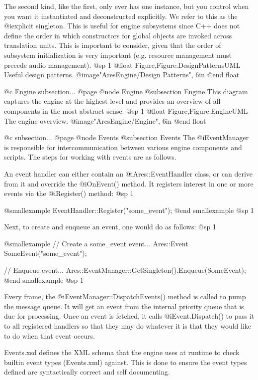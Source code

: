 The second kind, like the first, only ever has one instance, but you control when you want it instantiated and deconstructed explicitly. We refer to this as the @i{explicit singleton}. This is useful for engine subsystems since C++ does not define the order in which constructors for global objects are invoked across translation units. This is important to consider, given that the order of subsystem initialization is very important (e.g. resource management must precede audio management).
@sp 1
@float Figure,Figure:DesignPatternsUML
Useful design patterns.
@image{"AresEngine/Design Patterns", 6in}
@end float

@c Engine subsection...
@page
@node Engine
@subsection Engine
This diagram captures the engine at the highest level and provides an overview of all components in the most abstract sense.
@sp 1
@float Figure,Figure:EngineUML
The engine overview.
@image{"AresEngine/Engine", 6in}
@end float

@c subsection...
@page 
@node Events
@subsection Events
The @i{EventManager} is responsible for intercommunication between various engine components and scripts. The steps for working with events are as follows.

An event handler can either contain an @i{Ares::EventHandler} class, or can derive from it and override the @i{OnEvent()} method. It registers interest in one or more events via the @i{Register()} method:
@sp 1

@smallexample
EventHandler::Register("some_event");
@end smallexample
@sp 1

Next, to create and enqueue an event, one would do as follows:
@sp 1

@smallexample
// Create a some_event event...
Ares::Event SomeEvent("some_event");

// Enqueue event...
Ares::EventManager::GetSingleton().Enqueue(SomeEvent);
@end smallexample
@sp 1

Every frame, the @i{EventManager::DispatchEvents()} method is called to pump the message queue. It will get an event from the internal priority queue that is due for processing. Once an event is fetched, it calls @i{Event.Dispatch()} to pass it to all registered handlers so that they may do whatever it is that they would like to do when that event occurs.

Events.xsd defines the XML schema that the engine uses at runtime to check builtin event types (Events.xml) against. This is done to ensure the event types defined are syntactically correct and self documenting.

